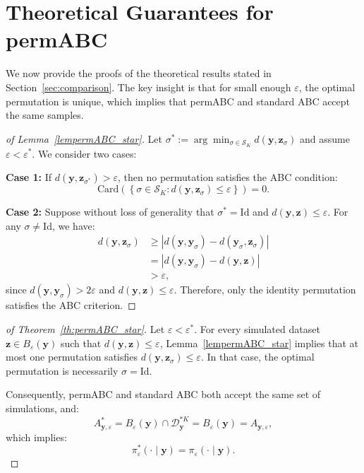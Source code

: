 \documentclass[lineno]{biometrika}
\def\dataspace{\mathcal{D}}
\def\obsdata{\mathbf{y}}
\def\simdata{\mathbf{z}}
\begin{document}
\section{Theoretical Guarantees for permABC}
\label{appendix_proofs}

We now provide the proofs of the theoretical results stated in Section~\ref{sec:comparison}. The key insight is that for small enough $\varepsilon$, the optimal permutation is unique, which implies that permABC and standard ABC accept the same samples.

\begin{proof}[of Lemma~\ref{lempermABC_star}]
Let $\sigma^* := \arg\min_{\sigma \in \mathcal{S}_K} d(\obsdata, \simdata_{\sigma})$ and assume $\varepsilon < \varepsilon^*$. We consider two cases:

\textbf{Case 1:} If $d(\obsdata, \simdata_{\sigma^*}) > \varepsilon$, then no permutation satisfies the ABC condition:
\[
\mathrm{Card} \left( \left\{ \sigma \in \mathcal{S}_K : d(\obsdata, \simdata_{\sigma}) \leq \varepsilon \right\} \right) = 0.
\]

\textbf{Case 2:} Suppose without loss of generality that $\sigma^* = \mathrm{Id}$ and $d(\obsdata, \simdata) \leq \varepsilon$. For any $\sigma \neq \mathrm{Id}$, we have:
\[
\begin{aligned}
d(\obsdata, \simdata_{\sigma}) 
&\geq \left| d(\obsdata, \obsdata_{\sigma}) - d(\obsdata_{\sigma}, \simdata_{\sigma}) \right| \\
&= \left| d(\obsdata, \obsdata_{\sigma}) - d(\obsdata, \simdata) \right| \\
&> \varepsilon,
\end{aligned}
\]
since $d(\obsdata, \obsdata_{\sigma}) > 2\varepsilon$ and $d(\obsdata, \simdata) \leq \varepsilon$. Therefore, only the identity permutation satisfies the ABC criterion.
\end{proof}

\medskip

\begin{proof}[of Theorem~\ref{th:permABC_star}]
Let $\varepsilon < \varepsilon^*$. For every simulated dataset $\simdata \in B_\varepsilon(\obsdata)$ such that $d(\obsdata, \simdata) \leq \varepsilon$, Lemma~\ref{lempermABC_star} implies that at most one permutation satisfies $d(\obsdata, \simdata_{\sigma}) \leq \varepsilon$. In that case, the optimal permutation is necessarily $\sigma = \mathrm{Id}$.

Consequently, permABC and standard ABC both accept the same set of simulations, and:
\[
A^*_{\obsdata,\varepsilon} = B_{\varepsilon}(\obsdata) \cap \dataspace_{\obsdata}^{*K} = B_{\varepsilon}(\obsdata) = A_{\obsdata,\varepsilon},
\]
which implies:
\[
\pi^*_{\varepsilon}(\cdot \mid \obsdata) = \pi_{\varepsilon}(\cdot \mid \obsdata).
\]


\end{proof}
\end{document}
